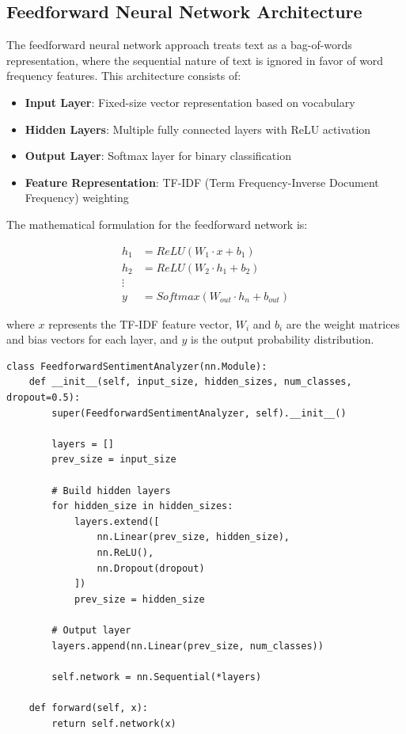 \documentclass[a4paper, journal]{IEEEtran}
\begin{document}
\subsection{Feedforward Neural Network Architecture}

The feedforward neural network approach treats text as a bag-of-words representation, where the sequential nature of text is ignored in favor of word frequency features. This architecture consists of:

\begin{itemize}
    \item \textbf{Input Layer}: Fixed-size vector representation based on vocabulary
    \item \textbf{Hidden Layers}: Multiple fully connected layers with ReLU activation
    \item \textbf{Output Layer}: Softmax layer for binary classification
    \item \textbf{Feature Representation}: TF-IDF (Term Frequency-Inverse Document Frequency) weighting
\end{itemize}

The mathematical formulation for the feedforward network is:

\begin{align}
h_1 &= ReLU(W_1 \cdot x + b_1) \\
h_2 &= ReLU(W_2 \cdot h_1 + b_2) \\
\vdots \\
y &= Softmax(W_{out} \cdot h_n + b_{out})
\end{align}

where $x$ represents the TF-IDF feature vector, $W_i$ and $b_i$ are the weight matrices and bias vectors for each layer, and $y$ is the output probability distribution.

\begin{lstlisting}[caption=Feedforward Neural Network Architecture]
class FeedforwardSentimentAnalyzer(nn.Module):
    def __init__(self, input_size, hidden_sizes, num_classes, dropout=0.5):
        super(FeedforwardSentimentAnalyzer, self).__init__()
        
        layers = []
        prev_size = input_size
        
        # Build hidden layers
        for hidden_size in hidden_sizes:
            layers.extend([
                nn.Linear(prev_size, hidden_size),
                nn.ReLU(),
                nn.Dropout(dropout)
            ])
            prev_size = hidden_size
        
        # Output layer
        layers.append(nn.Linear(prev_size, num_classes))
        
        self.network = nn.Sequential(*layers)
    
    def forward(self, x):
        return self.network(x)
\end{lstlisting}
\end{document}
